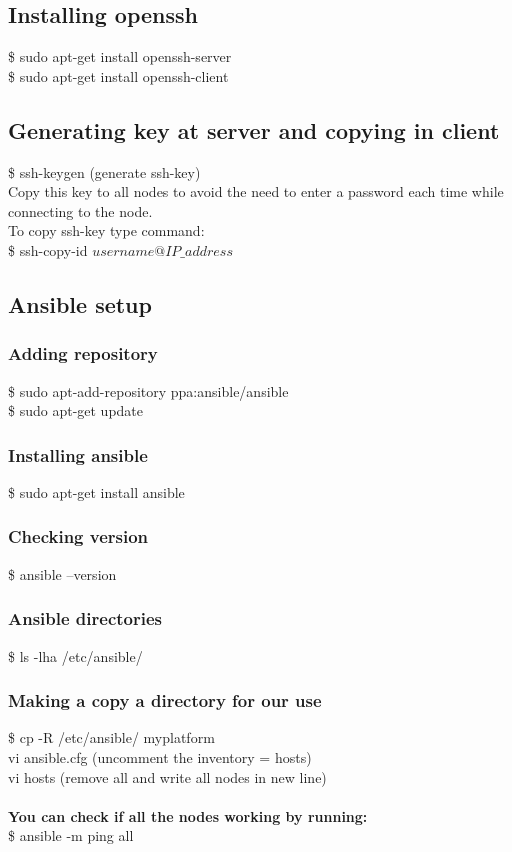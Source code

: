 \documentclass[12pt]{article}
\begin{document}
\subsection{Installing openssh}
\$ sudo apt-get install openssh-server\\
\$ sudo apt-get install openssh-client
\subsection{Generating key at server and copying in client}
\$ ssh-keygen (generate ssh-key)\\
Copy this key to all nodes to avoid the need to enter a password each time while connecting to the node.\\
To copy ssh-key type command:\\
\$ ssh-copy-id $username@IP\_address$
\subsection{Ansible setup}
\subsubsection{Adding repository}
\$ sudo apt-add-repository ppa:ansible/ansible\\
\$ sudo apt-get update
\subsubsection{Installing ansible}
\$ sudo apt-get install ansible
\subsubsection{Checking version}
\$ ansible  --version
\subsubsection{Ansible directories}
\$ ls -lha /etc/ansible/
\subsubsection{Making a copy a directory for our use}
\$ cp -R /etc/ansible/ myplatform\\
vi ansible.cfg (uncomment the inventory =  hosts)\\
vi hosts (remove all and write all nodes in new line)\\\\
\textbf{You can check if all the nodes working by running:}\\
\$ ansible -m ping all
\end{document}

